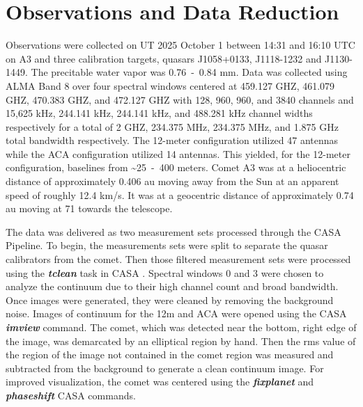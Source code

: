 \section{Observations and Data Reduction}

Observations were collected on UT 2025 October 1 between 14:31 and 16:10 UTC on A3 and three calibration targets, quasars J1058+0133, J1118-1232 and J1130-1449. The precitable water vapor was 0.76~-~0.84 mm. Data was collected using ALMA Band 8 over four spectral windows centered at 459.127 GHZ, 461.079 GHZ, 470.383 GHZ, and 472.127 GHZ with 128, 960, 960, and 3840 channels and 15,625 kHz, 244.141 kHz, 244.141 kHz, and 488.281 kHz channel widths respectively for a total of 2 GHZ, 234.375 MHz, 234.375 MHz, and 1.875 GHz total bandwidth respectively. The 12-meter configuration utilized 47 antennas while the ACA configuration utilized 14 antennas. This yielded, for the 12-meter configuration, baselines from \textasciitilde25~-~400 meters. Comet A3 was at a heliocentric distance of approximately 0.406 au moving away from the Sun at an apparent speed of roughly 12.4 km/s. It was at a geocentric distance of approximately 0.74 au moving at 71 \kms{} towards the telescope.

The data was delivered as two measurement sets processed through the CASA Pipeline. To begin, the measurements sets were split to separate the quasar calibrators from the comet. Then those filtered measurement sets were processed using the \emph{\textbf{tclean}} task in CASA \citep{McMullin2007}. Spectral windows 0 and 3 were chosen to analyze the continuum due to their high channel count and broad bandwidth. Once images were generated, they were cleaned by removing the background noise. Images of continuum for the 12m and ACA were opened using the CASA \emph{\textbf{imview}} command. The comet, which was detected near the bottom, right edge of the image, was demarcated by an elliptical region by hand. Then the rms value of the region of the image not contained in the comet region was measured and subtracted from the background to generate a clean continuum image. For improved visualization, the comet was centered using the \emph{\textbf{fixplanet}} and \emph{\textbf{phaseshift}} CASA commands.

